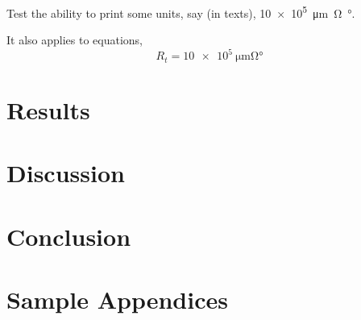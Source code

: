 \documentclass{zjui-report-simple}
\begin{document}
Test the ability to print some units, say (in texts), \SI{10e5}{\um\ohm\degree}.

It also applies to equations,
\begin{equation}
    R_{t}=\SI{10e5}{\um\ohm\degree}
\end{equation}
\section{Results}

\section{Discussion}

\section{Conclusion}



\printbibliography[title={References},heading=bibintoc]

\appendix
\section{Sample Appendices}
\end{document}
